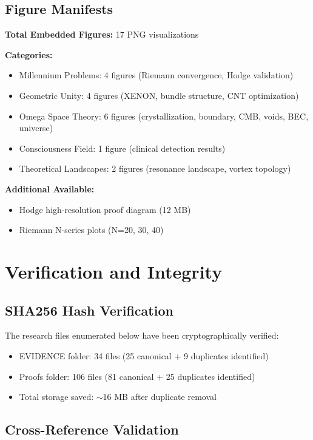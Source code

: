 \section{Figure Manifests}

\textbf{Total Embedded Figures:} 17 PNG visualizations

\textbf{Categories:}
\begin{itemize}
\item Millennium Problems: 4 figures (Riemann convergence, Hodge validation)
\item Geometric Unity: 4 figures (XENON, bundle structure, CNT optimization)
\item Omega Space Theory: 6 figures (crystallization, boundary, CMB, voids, BEC, universe)
\item Consciousness Field: 1 figure (clinical detection results)
\item Theoretical Landscapes: 2 figures (resonance landscape, vortex topology)
\end{itemize}

\textbf{Additional Available:}
\begin{itemize}
\item Hodge high-resolution proof diagram (12 MB)
\item Riemann N-series plots (N=20, 30, 40)
\end{itemize}

\chapter{Verification and Integrity}

\section{SHA256 Hash Verification}

The research files enumerated below have been cryptographically
verified:
\begin{itemize}
\item EVIDENCE folder: 34 files (25 canonical + 9 duplicates identified)
\item Proofs folder: 106 files (81 canonical + 25 duplicates identified)
\item Total storage saved: $\sim$16 MB after duplicate removal
\end{itemize}

\section{Cross-Reference Validation}

